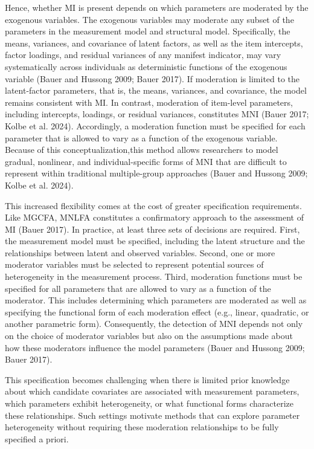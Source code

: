 \documentclass[
  man,
  floatsintext]{apa7}
\begin{document}
Hence, whether MI is present depends on which parameters are moderated
by the exogenous variables. The exogenous variables may moderate any
subset of the parameters in the measurement model and structural model.
Specifically, the means, variances, and covariance of latent factors, as
well as the item intercepts, factor loadings, and residual variances of
any manifest indicator, may vary systematically across individuals as
deterministic functions of the exogenous variable (Bauer and Hussong
2009; Bauer 2017). If moderation is limited to the latent-factor
parameters, that is, the means, variances, and covariance, the model
remains consistent with MI. In contrast, moderation of item-level
parameters, including intercepts, loadings, or residual variances,
constitutes MNI (Bauer 2017; Kolbe et al. 2024). Accordingly, a
moderation function must be specified for each parameter that is allowed
to vary as a function of the exogenous variable. Because of this
conceptualization,this method allows researchers to model gradual,
nonlinear, and individual-specific forms of MNI that are difficult to
represent within traditional multiple-group approaches (Bauer and
Hussong 2009; Kolbe et al. 2024).

This increased flexibility comes at the cost of greater specification
requirements. Like MGCFA, MNLFA constitutes a confirmatory approach to
the assessment of MI (Bauer 2017). In practice, at least three sets of
decisions are required. First, the measurement model must be specified,
including the latent structure and the relationships between latent and
observed variables. Second, one or more moderator variables must be
selected to represent potential sources of heterogeneity in the
measurement process. Third, moderation functions must be specified for
all parameters that are allowed to vary as a function of the moderator.
This includes determining which parameters are moderated as well as
specifying the functional form of each moderation effect (e.g., linear,
quadratic, or another parametric form). Consequently, the detection of
MNI depends not only on the choice of moderator variables but also on
the assumptions made about how these moderators influence the model
parameters (Bauer and Hussong 2009; Bauer 2017).

This specification becomes challenging when there is limited prior
knowledge about which candidate covariates are associated with
measurement parameters, which parameters exhibit heterogeneity, or what
functional forms characterize these relationships. Such settings
motivate methods that can explore parameter heterogeneity without
requiring these moderation relationships to be fully specified a priori.
\end{document}
